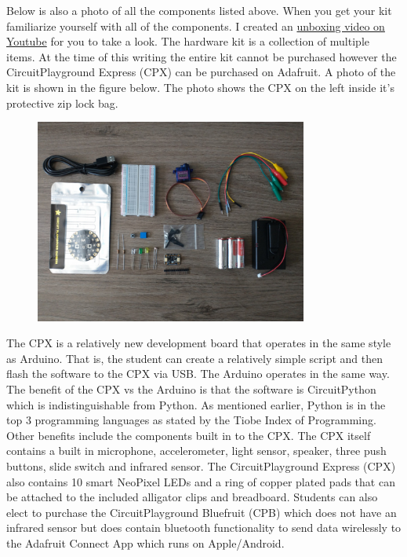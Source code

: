 Below is also a photo of all the components listed above. When you get
your kit familiarize yourself with all of the components. I created
an \href{https://youtu.be/6sNNQrhnzLE}{unboxing video on Youtube} 
for you to take a look. The hardware kit is a collection of multiple
items. At the time of this writing the entire kit cannot be purchased
however the CircuitPlayground Express (CPX) can be purchased on
Adafruit\cite{AdafruitMAIN}. A photo of the kit is shown in the figure below. The photo shows the CPX on the left inside it's
protective zip lock bag.

\begin{figure}[H]
  \begin{center}
    \includegraphics[width=0.8\textwidth]{Figures/components.png}
  \end{center}
\end{figure}

The CPX is a relatively new development board that operates in the
same style as Arduino\cite{Arduino}. That is, the student can
create a relatively simple script and then flash the software to the
CPX via USB. The Arduino operates in the same way. The benefit of the
CPX vs the Arduino is that the software is CircuitPython which is
indistinguishable from Python. As mentioned earlier, Python is in the
top 3 programming languages as stated by the Tiobe Index of
Programming\cite{Tiobe}. Other benefits include the components
built in to the CPX. The CPX itself contains a built in microphone,
accelerometer, light sensor, speaker, three push buttons, slide switch
and infrared sensor. The CircuitPlayground Express (CPX) also contains
10 smart NeoPixel LEDs and a ring of copper plated pads that can be
attached to the included alligator clips and breadboard. Students can
also elect to purchase the CircuitPlayground Bluefruit (CPB) which
does not have an infrared sensor but does contain bluetooth
functionality to send data wirelessly to the Adafruit Connect App
which runs on Apple/Android\cite{AdafruitBLE}.

